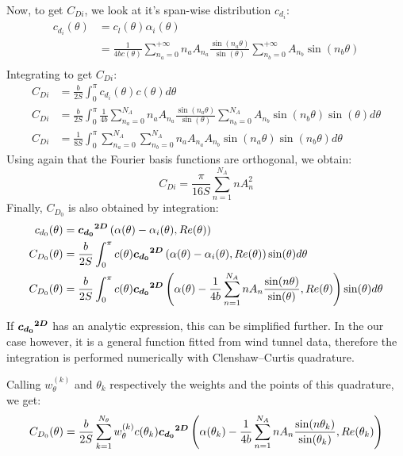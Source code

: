 \documentclass[letterpaper,12pt]{article}
\begin{document}
\noindent Now, to get $C_{Di}$, we look at it's span-wise distribution $c_{d_i}$:
\begin{align*}
	c_{d_i} (\theta) &= c_l (\theta) \alpha_i (\theta) \\
					&=  \frac{1}{4bc(\theta)}\sum_{n_a=0}^{+\infty} n_a A_{n_a} \frac{ \sin(n_a\theta) }{\sin(\theta)} \sum_{n_b=0}^{+\infty} A_{n_b} \sin(n_b\theta) \\
\end{align*}
Integrating to get $C_{Di}$:
\begin{align}
	C_{Di} &= \frac b {2S} \int_{0}^{\pi} c_{d_i}(\theta) c(\theta) d\theta \nonumber\\
	C_{Di} &= \frac b {2S} \int_{0}^{\pi} \frac{1}{4b}
		\sum_{n_a=0}^{N_A} n_a A_{n_a} \frac{ \sin(n_a\theta) }{\sin(\theta)} 
		\sum_{n_b=0}^{N_A} A_{n_b} \sin(n_b\theta) \sin(\theta) 
		d\theta  \nonumber \\ 
	C_{Di} &= \frac 1 {8S} \int_{0}^{\pi} \sum_{n_a=0}^{N_A} \sum_{n_b=0}^{N_A} n_a A_{n_a}A_{n_b} \sin(n_a\theta) \sin(n_b\theta) d\theta
\end{align}
Using again that the Fourier basis functions are orthogonal, we obtain:
%
\begin{equation}
	\label{eq:cdi}
	C_{Di} = \frac {\pi}{16S} \sum_{n=1}^{N_A} n A_{n}^2
\end{equation}
%
Finally, $C_{D_0}$ is also obtained by integration:
%
\begin{align*}
	c_{d_0}(\theta) &= \boldsymbol{{c_{d_0}}^{2D}}\left( \alpha(\theta) - \alpha_i(\theta), Re(\theta)\right) \\
	C_{D_0}(\theta) &= \frac b {2S} \int_{0}^{\pi} c(\theta) \boldsymbol{{c_{d_0}}^{2D}}\left( \alpha(\theta) - \alpha_i(\theta), Re(\theta)\right) \sin(\theta) d\theta \\
	C_{D_0}(\theta) &= \frac b {2S} \int_{0}^{\pi} c(\theta) \boldsymbol{{c_{d_0}}^{2D}}\left( \alpha(\theta) - \frac {1}{4b}  \sum_{n=1}^{N_A} n A_n \frac{ \sin(n\theta) }{\sin(\theta)} , Re(\theta)\right) \sin(\theta) d\theta
\end{align*}

If $\boldsymbol{{c_{d_0}}^{2D}}$ has an analytic expression, this can be simplified further.
In the our case however, it is a general function fitted from wind tunnel data, 
therefore the integration is performed numerically with Clenshaw–Curtis quadrature. 

Calling $w_{\theta}^{(k)}$ and $\theta_k$ respectively the weights and the points of this quadrature, we get:
\begin{equation}
	\label{eq:cd0}
	C_{D_0}(\theta) = \frac b {2S} \sum_{k=1}^{N_{\theta}} w_{\theta}^{(k)} c(\theta_k) \boldsymbol{{c_{d_0}}^{2D}}\left( \alpha(\theta_k) - \frac {1}{4b} \sum_{n=1}^{N_A} n A_n \frac{ \sin(n\theta_k) }{\sin(\theta_k)} , Re(\theta_k)\right)
\end{equation}
\end{document}
